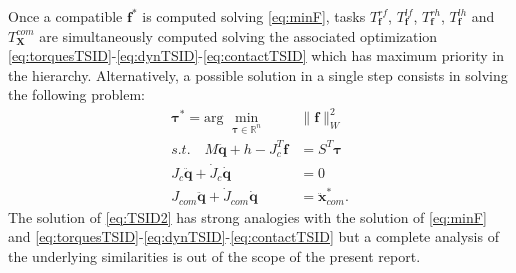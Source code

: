 \documentclass[12pt,a4paper,twoside]{article}
\begin{document}
Once a compatible $\bm f^*$ is computed solving \eqref{eq:minF}, tasks $T^{rf}_{\bm f}$, $T^{lf}_{\bm f}$, $T^{rh}_{\bm f}$, $T^{lh}_{\bm f}$ and $T^{com}_{\bm X}$ are simultaneously computed solving the associated optimization \eqref{eq:torquesTSID}-\eqref{eq:dynTSID}-\eqref{eq:contactTSID} which has maximum priority in the hierarchy. Alternatively, a possible solution in a single step consists in solving the following problem:
\begin{subequations} \label{eq:TSID2}
\begin{align} 
\label{eq:torquesTSID2}
\bm {\tau}^* = \mbox{arg } \min_{\bm \tau \in \mathbb{R}^n}\,& \| \bm f \|^2_W \\
\label{eq:dynTSID2}
s.t. \quad M \ddot{\bm q} + h - J_c^T \bm f & = S^T \bm \tau \\
\label{eq:contactTSID2}
  J_c \ddot{\bm q} + \dot{J}_c \dot{\bm q} & = 0 \\
 J_{com} \ddot{\bm q} + \dot{J}_{com} \dot{\bm q} & =  \ddot {\bm x}^*_{com}.
\end{align}
\end{subequations}
The solution of \eqref{eq:TSID2} has strong analogies with the solution of \eqref{eq:minF} and \eqref{eq:torquesTSID}-\eqref{eq:dynTSID}-\eqref{eq:contactTSID} but a complete analysis of the underlying similarities is out of the scope of the present report. 
\end{document}
